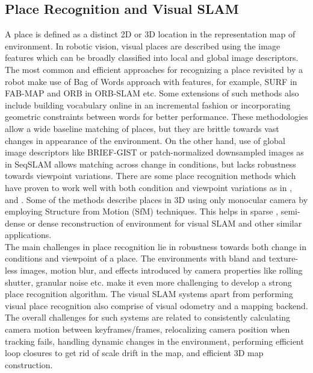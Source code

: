\subsection{Place Recognition and Visual SLAM}
A place is defined as a distinct 2D or 3D location in the representation map of environment. In robotic vision, visual places are described using the image features which can be broadly classified into local and global image descriptors. The most common and efficient approaches for recognizing a place revisited by a robot make use of Bag of Words approach with features, for example, SURF in FAB-MAP \cite{Cummins2010} and ORB in ORB-SLAM \cite{Montiel2015} etc. Some extensions of such methods also include building vocabulary online in an incremental fashion or incorporating geometric constraints between words for better performance. These methodologies allow a wide baseline matching of places, but they are brittle towards vast changes in appearance of the environment. On the other hand, use of global image descriptors like BRIEF-GIST \cite{Sunderhauf2011} or patch-normalized downsampled images as in SeqSLAM \cite{Milford2012} allows matching across change in conditions, but lacks robustness towards viewpoint variations. There are some place recognition methods which have proven to work well with both condition and viewpoint variations as in \cite{McManus2014}, \cite{Milford2008} and \cite{Niko2015}. Some of the methods describe places in 3D using only monocular camera by employing Structure from Motion (SfM) techniques. This helps in sparse \cite{Montiel2015}, semi-dense \cite{Engel2014lsd, Mur-Artal2015b} or dense \cite{Newcombe2011} reconstruction of environment for visual SLAM and other similar applications.
\\
The main challenges in place recognition lie in robustness towards both change in conditions and viewpoint of a place. The environments with bland and texture-less images, motion blur, and effects introduced by camera properties like rolling shutter, granular noise etc. make it even more challenging to develop a strong place recognition algorithm.
The visual SLAM systems apart from performing visual place recognition also comprise of visual odometry and a mapping backend. The overall challenges for such systems are related to consistently calculating camera motion between keyframes/frames, relocalizing camera position when tracking fails, handling dynamic changes in the environment, performing efficient loop closures to get rid of scale drift in the map, and efficient 3D map construction.
\\
